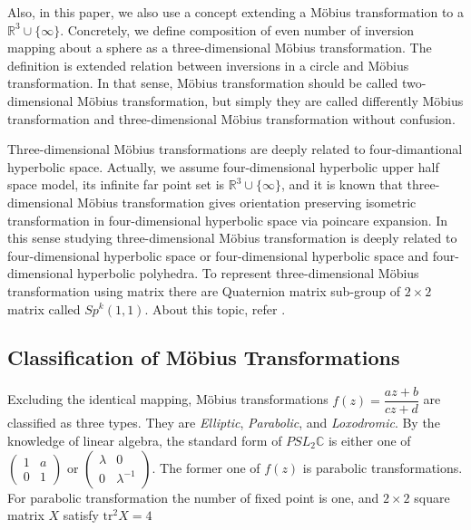 Also, in this paper, we also use a concept extending a M\"obius
transformation to a $\mathbb{R}^3\cup\{\infty\}$.
Concretely, we define composition of even number of inversion mapping
about a sphere as a three-dimensional M\"obius transformation.
The definition is extended relation between inversions in a circle and
M\"obius transformation.
In that sense, M\"obius transformation should be called two-dimensional
M\"obius transformation, but
simply they are called differently M\"obius transformation and
three-dimensional M\"obius transformation without confusion.

Three-dimensional M\"obius transformations are deeply related to
four-dimantional hyperbolic space. Actually, we assume four-dimensional
hyperbolic upper half space model, its infinite far point set is
$\mathbb{R}^3\cup\{\infty\}$, and it is known that three-dimensional M\"obius
transformation gives orientation preserving isometric transformation in
four-dimensional hyperbolic space via poincare expansion.
In this sense studying three-dimensional M\"obius transformation is
deeply related to four-dimensional hyperbolic space or four-dimensional
hyperbolic space and four-dimensional hyperbolic polyhedra.
To represent three-dimensional M\"obius transformation using matrix
there are Quaternion matrix sub-group of $2 \times 2$ matrix called
$Sp^k(1,1)$. About this topic, refer
\cite{sakugawa2010limit}\cite{sakugawa2007master}.


\subsection{Classification of M\"obius Transformations}

Excluding the identical mapping, M\"obius transformations
$f(z) = \dfrac{az + b}{cz + d}$ are classified as three types.
They are \textit{Elliptic}, \textit{Parabolic}, and \textit{Loxodromic}.
By the knowledge of linear algebra, the standard form of $PSL_2\mathbb{C}$
is either one of $\begin{pmatrix}1 & a \\ 0 & 1 \end{pmatrix}$ or
$\begin{pmatrix}\lambda & 0 \\ 0 & \lambda^{-1} \end{pmatrix}$.
The former one of $f(z)$ is parabolic transformations.
For parabolic transformation the number of fixed point is one, and
$2 \times 2$ square matrix $X$ satisfy $\mathrm{tr}^2X = 4$

